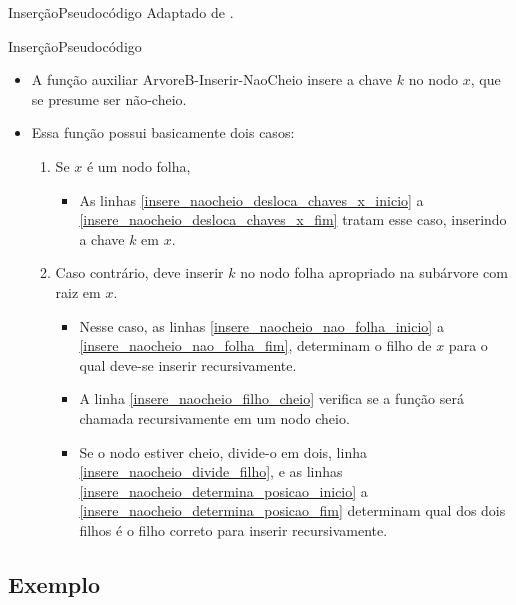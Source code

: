 \documentclass[aspectratio=169]{beamer}
\begin{document}
{\begin{frame}{Inserção}{Pseudocódigo}
\tiny{Adaptado de \cite{Cormen2012}.}
\end{frame}


\begin{frame}{Inserção}{Pseudocódigo}
\begin{itemize}
 \item A função auxiliar ArvoreB-Inserir-NaoCheio insere a chave $k$ no nodo $x$, que se presume ser não-cheio.
 \item Essa função possui basicamente dois casos:
 \begin{enumerate}
 \item Se $x$ é um nodo folha, 
 \begin{itemize}
 \item As linhas \ref{insere_naocheio_desloca_chaves_x_inicio} a \ref{insere_naocheio_desloca_chaves_x_fim} tratam esse caso, inserindo a chave $k$ em $x$.
 \end{itemize}
  \item Caso contrário, deve inserir $k$ no nodo folha apropriado na subárvore com raiz em $x$.
	\begin{itemize}
 	\item Nesse caso, as linhas \ref{insere_naocheio_nao_folha_inicio} a \ref{insere_naocheio_nao_folha_fim}, determinam o filho de $x$ para o qual deve-se inserir recursivamente.
 	\item A linha \ref{insere_naocheio_filho_cheio} verifica se a função será chamada recursivamente em um nodo cheio.
 	\item Se o nodo estiver cheio, divide-o em dois, linha \ref{insere_naocheio_divide_filho}, e as linhas \ref{insere_naocheio_determina_posicao_inicio} a \ref{insere_naocheio_determina_posicao_fim} determinam qual dos dois filhos é o filho correto para inserir recursivamente. 
 	\end{itemize}
 \end{enumerate} 
\end{itemize}
\end{frame}

\subsection{Exemplo}

}
\end{document}
